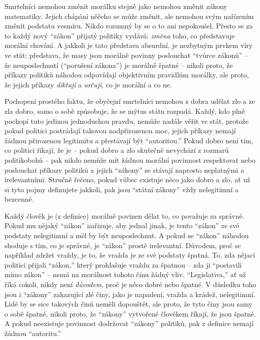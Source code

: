 \documentclass{book}
\begin{document}
Smrtelníci nemohou změnit morálku stejně jako nemohou změnit zákony matematiky. Jejich chápání něčeho se může změnit, ale nemohou svým nařízením změnit podstatu vesmíru. Nikdo rozumný by se o to ani nepokoušel. Přesto se za to každý nový \enquote{zákon} přijatý politiky vydává: \emph{změna} toho, co představuje morální chování. A jakkoli je tato představa absurdní, je nezbytným prvkem víry ve stát: představa, že masy jsou morálně povinny poslouchat \enquote{tvůrce zákonů} -- že neuposlechnutí (\enquote{porušení zákona}) je morálně špatné -- nikoli proto, že příkazy politiků náhodou odpovídají objektivním pravidlům morálky, ale proto, že jejich příkazy \emph{diktují} a \emph{určují}, co je morální a co ne.

Pochopení prostého faktu, že obyčejní smrtelníci nemohou z dobra udělat zlo a ze zla dobro, samo o sobě způsobuje, že se mýtus státu rozpadá. Každý, kdo plně pochopí tuto jedinou jednoduchou pravdu, nemůže nadále věřit ve stát, protože pokud politici postrádají takovou nadpřirozenou moc, jejich příkazy nemají žádnou přirozenou legitimitu a přestávají být \enquote{autoritou.} Pokud dobro není tím, co politici říkají, že je -- pokud dobro a zlo skutečně nevychází z rozmarů politikobohů -- pak nikdo nemůže mít žádnou morální povinnost respektovat nebo poslouchat příkazy politiků a jejich \enquote{zákony} se stávají naprosto neplatnými a irelevantními. Stručně řečeno, pokud vůbec existuje něco jako dobro a zlo, ať už si tyto pojmy definujete jakkoli, pak jsou \enquote{státní zákony} vždy nelegitimní a bezcenné.

Každý člověk je (z definice) morálně povinen dělat to, co považuje za správné. Pokud mu nějaký \enquote{zákon} nařizuje, aby jednal jinak, je tento \enquote{zákon} ze své podstaty nelegitimní a měl by být neuposlechnut. A pokud se \enquote{zákon} náhodou shoduje s tím, co je správné, je \enquote{zákon} prostě irelevantní. Důvodem, proč se například zdržet vraždy, je to, že vražda je ze své podstaty špatná. To, zda nějací politici přijali \enquote{zákon,} který prohlašuje vraždu za špatnou -- zda ji \enquote{postavili mimo zákon} -- nemá na morálnost tohoto činu žádný vliv. \enquote{Legislativa,} ať už říká cokoli, nikdy není \emph{důvodem}, proč je něco dobré nebo špatné. V důsledku toho jsou i \enquote{zákony} zakazující zlé činy, jako je napadení, vražda a krádež, nelegitimní. Lidé by se sice takových činů neměli dopouštět, ale proto, že tyto činy jsou samy o sobě špatné, nikoli proto, že \enquote{zákony} vytvořené člověkem říkají, že jsou špatné. A pokud neexistuje povinnost dodržovat \enquote{zákony} politiků, pak z definice nemají žádnou \enquote{autoritu.}
\end{document}
